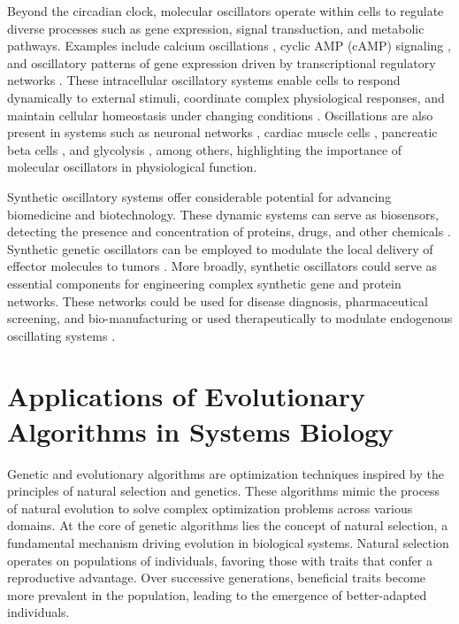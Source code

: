 \documentclass[12pt]{report}
\begin{document}
Beyond the circadian clock, molecular oscillators operate within cells to regulate diverse processes such as gene expression, signal transduction, and metabolic pathways. Examples include calcium oscillations \cite{Smedler2014}, cyclic AMP (cAMP) signaling \cite{Dyachok2006}, and oscillatory patterns of gene expression driven by transcriptional regulatory networks \cite{Cerone2012}. These intracellular oscillatory systems enable cells to respond dynamically to external stimuli, coordinate complex physiological responses, and maintain cellular homeostasis under changing conditions \cite{Cheong2010, Jolma2010}. Oscillations are also present in systems such as neuronal networks \cite{Cebolla2019}, cardiac muscle cells \cite{Weiss2010, Montano2001}, pancreatic beta cells \cite{Watts2014}, and glycolysis \cite{Ghosh1964}, among others, highlighting the importance of molecular oscillators in physiological function.

Synthetic oscillatory systems offer considerable potential for advancing biomedicine and biotechnology. These dynamic systems can serve as biosensors, detecting the presence and concentration of proteins, drugs, and other chemicals \cite{Kis2015, CubillosRuiz2021}. Synthetic genetic oscillators can be employed to modulate the local delivery of effector molecules to tumors \cite{CubillosRuiz2021}. More broadly, synthetic oscillators could serve as essential components for engineering complex synthetic gene and protein networks. These networks could be used for disease diagnosis, pharmaceutical screening, and bio-manufacturing or used therapeutically to modulate endogenous oscillating systems \cite{Kis2015}.




\section{Applications of Evolutionary Algorithms in Systems Biology}
\label{section:intro_GA}
Genetic and evolutionary algorithms are optimization techniques inspired by the principles of natural selection and genetics. These algorithms mimic the process of natural evolution to solve complex optimization problems across various domains. At the core of genetic algorithms lies the concept of natural selection, a fundamental mechanism driving evolution in biological systems. Natural selection operates on populations of individuals, favoring those with traits that confer a reproductive advantage. Over successive generations, beneficial traits become more prevalent in the population, leading to the emergence of better-adapted individuals.
\end{document}
